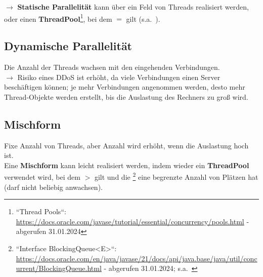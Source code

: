 $\rightarrow$ \textbf{Statische Parallelität} kann über ein Feld von Threads realisiert werden, oder einen \textbf{ThreadPool}\footnote{
``Thread Pools``: \url{https://docs.oracle.com/javase/tutorial/essential/concurrency/pools.html} - abgerufen 31.01.2024
}, bei dem  $=$  gilt (s.a.~\cite[146]{Oec22}).


\subsection*{Dynamische Parallelität}
Die Anzahl der Threads wachsen mit den eingehenden Verbindungen.\\

$\rightarrow$ Risiko eines DDoS ist erhöht, da viele Verbindungen einen Server beschäftigen können; je mehr Verbindungen angenommen werden, desto mehr Thread-Objekte werden erstellt, bis die Auslastung des Rechners zu groß wird.

\subsection*{Mischform}
Fixe Anzahl von Threads, aber Anzahl wird erhöht, wenn die Auslastung hoch ist.\\

\noindent
Eine \textbf{Mischform} kann leicht realisiert werden, indem wieder ein \textbf{ThreadPool} verwendet wird, bei dem  $>$  gilt und die \footnote{ ``Interface BlockingQueue<E>``: \url{https://docs.oracle.com/en/java/javase/21/docs/api/java.base/java/util/concurrent/BlockingQueue.html} - abgerufen 31.01.2024; s.a.~\cite[146]{Oec22}} eine begrenzte Anzahl von Plätzen hat (darf nicht beliebig anwachsen).